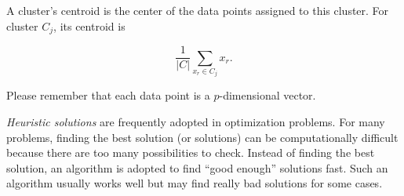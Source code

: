 A cluster's centroid is  the center of the data points assigned to this cluster.
For cluster $C_j$, its centroid is 

\begin{equation}
\frac{1}{|C|} \underset{x_r \in C_j}{\sum} x_r.
\end{equation}  

Please remember that each data point is a $p$-dimensional vector.

{\it Heuristic solutions} are frequently adopted in optimization
  problems.  For many problems, finding the best solution (or
  solutions) can be computationally difficult because there are too
  many possibilities to check.  Instead of finding the best solution,
  an algorithm is adopted to find ``good enough'' solutions fast. Such
  an algorithm usually works well but may find really bad solutions
  for some cases.  


